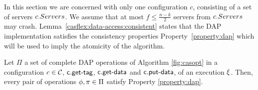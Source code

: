 In this section we are concerned with only one configuration $c$, consisting of a set of servers 
$c.Servers$.
We assume that at most $f \leq \frac{n-k}{2}$ servers from $c.Servers$ may crash.  
Lemma~\ref{casflex:data-access:consistent} states that the DAP implementation 
 satisfies the  consistency properties Property~\ref{property:dap}  which will be used to 
imply the atomicity of the \ares{} algorithm. 
\label{sec:primitives}

						
 \begin{theorem}[Safety]\label{casflex:data-access:consistent}
Let $\Pi$ a set of complete DAP operations of Algorithm \ref{fig:casopt} in a configuration $c\in\mathcal{C}$,
$\act{c.get-tag}$, $\act{c.get-data}$ and $\act{c.put-data}$,
of an execution $\EX$. Then, every pair of operations $\phi,\pi\in\Pi$ satisfy Property \ref{property:dap}.
\end{theorem}


